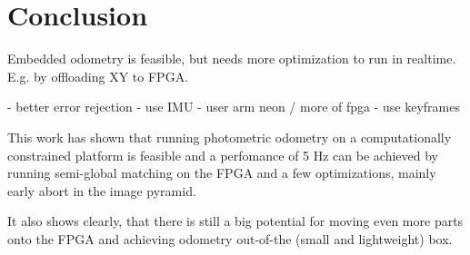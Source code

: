 \chapter{Conclusion}
\label{sec:conclusion}

Embedded odometry is feasible, but needs more optimization to run in realtime. E.g. by offloading XY to FPGA.

- better error rejection
- use IMU
- user arm neon / more of fpga
- use keyframes


This work has shown that running photometric odometry on a computationally
constrained platform is feasible and a perfomance of 5 Hz can be achieved by
running semi-global matching on the FPGA and a few optimizations, mainly early
abort in the image pyramid.

It also shows clearly, that there is still a big potential for moving even more
parts onto the FPGA and achieving odometry out-of-the (small and lightweight) box.

